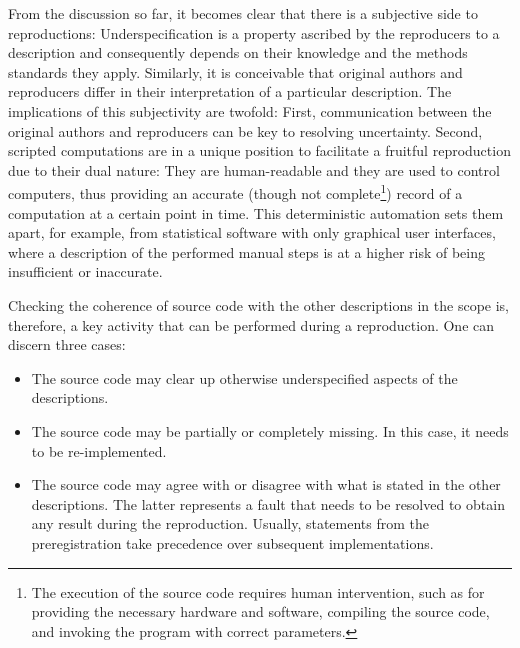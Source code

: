 \documentclass[authordate, meta]{jote-new-article}
\begin{document}
	From the discussion so far, it becomes clear that there is a subjective side to reproductions: Underspecification is a property ascribed by the reproducers to a description and consequently depends on their knowledge and the methods standards they apply. Similarly, it is conceivable that original authors and reproducers differ in their interpretation of a particular description. The implications of this subjectivity are twofold: First, communication between the original authors and reproducers can be key to resolving uncertainty. Second, scripted computations are in a unique position to facilitate a fruitful reproduction due to their dual nature: They are human-readable and they are used to control computers, thus providing an accurate (though not complete\footnote{ The execution of the source code requires human intervention, such as for providing the necessary hardware and software, compiling the source code, and invoking the program with correct parameters.}) record of a computation at a certain point in time. This deterministic automation sets them apart, for example, from statistical software with only graphical user interfaces, where a description of the performed manual steps is at a higher risk of being insufficient or inaccurate.


	Checking the coherence of source code with the other descriptions in the scope is, therefore, a key activity that can be performed during a reproduction. One can discern three cases:
	\begin{itemize}


		\item The source code may clear up otherwise underspecified aspects of the descriptions.



		\item
		The source code may be partially or completely missing. In this case, it needs to be re-implemented.



		\item The source code may agree with or disagree with what is stated in the other descriptions. The latter represents a fault that needs to be resolved to obtain any result during the reproduction. Usually, statements from the preregistration take precedence over subsequent implementations.

	\end{itemize}
\end{document}
